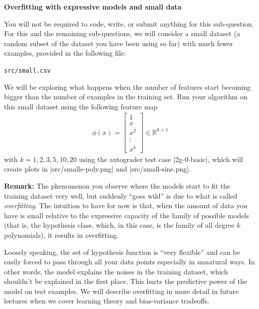 \item {} {\bf Overfitting with expressive models and small data}

You will not be required to code, write, or submit anything for this sub-question.  For this and the remaining sub-questions, we will consider a small
dataset (a random subset of the dataset you have been using so far) with much fewer examples, provided in
the following file:
%
\begin{center}
	\texttt{src/small.csv}
\end{center}
%

We will be exploring what happens when the number of features start becoming bigger than the number of 
examples in the training set. Run your algorithm on this small dataset using the following feature map 
\begin{align}
\phi(x) = \left[\begin{array}{c} 1\\ x \\ x^2\\ \vdots \\x^k \end{array}\right]\in \mathbb{R}^{k+1} 
\end{align}
with $k = 1,2,3,5,10,20$ using the autograder test case |2g-0-basic|, which will create plots in |src/smalle-poly.png| and |src/small-sine.png|. 

\textbf{Remark: } The phenomenon you observe where the models start to fit the training dataset very well, but suddenly ``goes wild'' is due to what is called \emph{overfitting}. The intuition to have for now is that, when the amount of data you have is small relative to the expressive capacity of the family of possible models (that is, the hypothesis class, which, in this case, is the family of all degree $k$ polynomials), it results in overfitting.  

Loosely speaking, the set of hypothesis function is ``very flexible'' and can be easily forced to pass through all your data points especially in unnatural ways. In other words, the  model explains the noises in the training dataset, which shouldn't be explained in the first place. This hurts the predictive power of the model on test examples. We will describe overfitting in more detail in future lectures when we cover learning theory and bias-variance tradeoffs.\\

